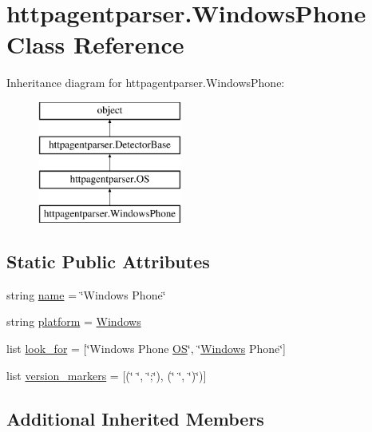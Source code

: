 \hypertarget{classhttpagentparser_1_1_windows_phone}{}\section{httpagentparser.\+Windows\+Phone Class Reference}
\label{classhttpagentparser_1_1_windows_phone}
Inheritance diagram for httpagentparser.\+Windows\+Phone\+:\begin{figure}[H]
\begin{center}
\leavevmode
\includegraphics[height=4.000000cm]{classhttpagentparser_1_1_windows_phone}
\end{center}
\end{figure}
\subsection*{Static Public Attributes}
\begin{DoxyCompactItemize}
\item 
string \hyperlink{classhttpagentparser_1_1_windows_phone_a7c794db7c90aa462a523f6cdf89086d2}{name} = \char`\"{}Windows Phone\char`\"{}
\item 
string \hyperlink{classhttpagentparser_1_1_windows_phone_a15ed99a57eb909ace7f81f20d6657c80}{platform} = \textquotesingle{}\hyperlink{classhttpagentparser_1_1_windows}{Windows}\textquotesingle{}
\item 
list \hyperlink{classhttpagentparser_1_1_windows_phone_aa2cb58b0def9fcaedd2098b974038364}{look\+\_\+for} = \mbox{[}\char`\"{}Windows Phone \hyperlink{classhttpagentparser_1_1_o_s}{OS}\char`\"{}, \char`\"{}\hyperlink{classhttpagentparser_1_1_windows}{Windows} Phone\char`\"{}\mbox{]}
\item 
list \hyperlink{classhttpagentparser_1_1_windows_phone_a831e0bf92f4204a06c41bac10f5269df}{version\+\_\+markers} = \mbox{[}(\char`\"{} \char`\"{}, \char`\"{};\char`\"{}), (\char`\"{} \char`\"{}, \char`\"{})\char`\"{})\mbox{]}
\end{DoxyCompactItemize}
\subsection*{Additional Inherited Members}


